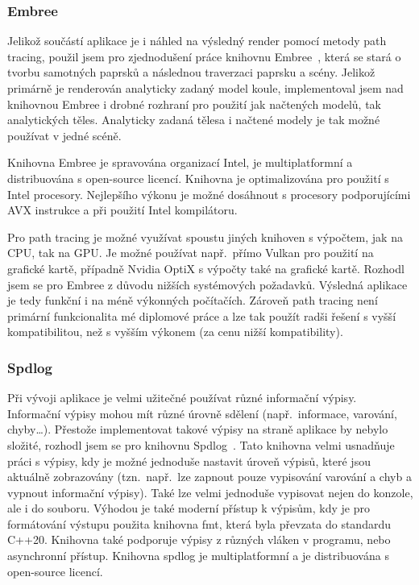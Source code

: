 \documentclass[czech,master]{diploma}
\begin{document}
\subsubsection*{Embree}
Jelikož součástí aplikace je i náhled na výsledný render pomocí metody path tracing, použil jsem pro zjednodušení práce knihovnu Embree~\cite{sourceEmbree}, která se stará o tvorbu samotných paprsků a následnou traverzaci paprsku a scény. Jelikož primárně je renderován analyticky zadaný model koule, implementoval jsem nad knihovnou Embree i drobné rozhraní pro použití jak načtených modelů, tak analytických těles. Analyticky zadaná tělesa i načtené modely je tak možné používat v jedné scéně.\par
Knihovna Embree je spravována organizací Intel, je multiplatformní a distribuována s open-source licencí. Knihovna je optimalizována pro použití s Intel procesory. Nejlepšího výkonu je možné dosáhnout s procesory podporujícími AVX instrukce a při použití Intel kompilátoru.\par
Pro path tracing je možné využívat spoustu jiných knihoven s výpočtem, jak na CPU, tak na GPU\@. Je možné používat např.\ přímo Vulkan pro použití na grafické kartě, případně Nvidia OptiX s výpočty také na grafické kartě. Rozhodl jsem se pro Embree z důvodu nižších systémových požadavků. Výsledná aplikace je tedy funkční i na méně výkonných počítačích. Zároveň path tracing není primární funkcionalita mé diplomové práce a lze tak použít radši řešení s vyšší kompatibilitou, než s vyšším výkonem (za cenu nižší kompatibility).

\subsubsection*{Spdlog}
Při vývoji aplikace je velmi užitečné používat různé informační výpisy. Informační výpisy mohou mít různé úrovně sdělení (např.\ informace, varování, chyby\dots). Přestože implementovat takové výpisy na straně aplikace by nebylo složité, rozhodl jsem se pro knihovnu Spdlog~\cite{sourceSpdlog}. Tato knihovna velmi usnadňuje práci s výpisy, kdy je možné jednoduše nastavit úroveň výpisů, které jsou aktuálně zobrazovány (tzn.\ např.\ lze zapnout pouze vypisování varování a chyb a vypnout informační výpisy). Také lze velmi jednoduše vypisovat nejen do konzole, ale i do souboru. Výhodou je také moderní přístup k výpisům, kdy je pro formátování výstupu použita knihovna fmt, která byla převzata do standardu C++20. Knihovna také podporuje výpisy z různých vláken v programu, nebo asynchronní přístup. Knihovna spdlog je multiplatformní a je distribuována s open-source licencí.
\end{document}
